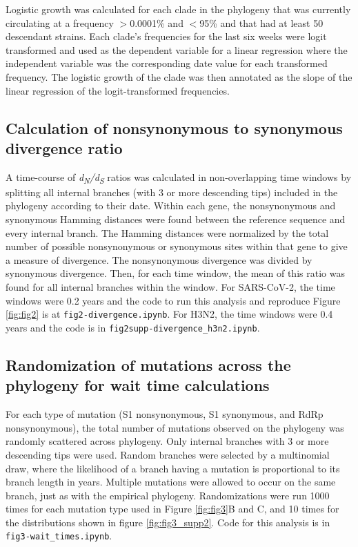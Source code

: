 \documentclass[12pt, letterpaper]{article}
\begin{document}
Logistic growth was calculated for each clade in the phylogeny that was currently circulating at a frequency $>$0.0001\% and $<$95\% and that had at least 50 descendant strains. Each clade’s frequencies for the last six weeks were logit transformed and used as the dependent variable for a linear regression where the independent variable was the corresponding date value for each transformed frequency. The logistic growth of the clade was then annotated as the slope of the linear regression of the logit-transformed frequencies.

\subsection*{Calculation of nonsynonymous to synonymous divergence ratio}
A time-course of \emph{d\textsubscript{N}/d\textsubscript{S}} ratios was calculated in non-overlapping time windows by splitting all internal branches (with 3 or more descending tips) included in the phylogeny according to their date. Within each gene, the nonsynonymous and synonymous Hamming distances were found between the reference sequence and every internal branch. The Hamming distances were normalized by the total number of possible nonsynonymous or synonymous sites within that gene to give a measure of divergence. The nonsynonymous divergence was divided by synonymous divergence. Then, for each time window, the mean of this ratio was found for all internal branches within the window. For SARS-CoV-2, the time windows were 0.2 years and the code to run this analysis and reproduce Figure \ref{fig:fig2} is at \texttt{fig2-divergence.ipynb}. For H3N2, the time windows were 0.4 years and the code is in \texttt{fig2supp-divergence\_h3n2.ipynb}.

\subsection*{Randomization of mutations across the phylogeny for wait time calculations}
For each type of mutation (S1 nonsynonymous, S1 synonymous, and RdRp nonsynonymous), the total number of mutations observed on the phylogeny was randomly scattered across phylogeny. Only internal branches with 3 or more descending tips were used. Random branches were selected by a multinomial draw, where the likelihood of a branch having a mutation is proportional to its branch length in years. Multiple mutations were allowed to occur on the same branch, just as with the empirical phylogeny. Randomizations were run 1000 times for each mutation type used in Figure \ref{fig:fig3}B and C, and 10 times for the distributions shown in figure \ref{fig:fig3_supp2}. Code for this analysis is in \texttt{fig3-wait\_times.ipynb}.
\end{document}
